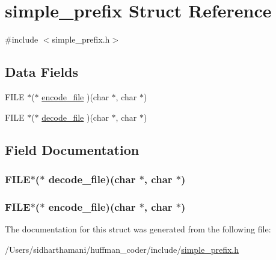 \hypertarget{structsimple__prefix}{\section{simple\-\_\-prefix Struct Reference}
\label{structsimple__prefix}
}


{\ttfamily \#include $<$simple\-\_\-prefix.\-h$>$}

\subsection*{Data Fields}
\begin{DoxyCompactItemize}
\item 
F\-I\-L\-E $\ast$($\ast$ \hyperlink{structsimple__prefix_a73d0a239981b130553964b3839c20bdf}{encode\-\_\-file} )(char $\ast$, char $\ast$)
\item 
F\-I\-L\-E $\ast$($\ast$ \hyperlink{structsimple__prefix_a58708e15f01f3be37e12d3194e953b41}{decode\-\_\-file} )(char $\ast$, char $\ast$)
\end{DoxyCompactItemize}


\subsection{Field Documentation}
\hypertarget{structsimple__prefix_a58708e15f01f3be37e12d3194e953b41}{
\subsubsection[{decode\-\_\-file}]{\setlength{\rightskip}{0pt plus 5cm}F\-I\-L\-E$\ast$($\ast$ decode\-\_\-file)(char $\ast$, char $\ast$)}}\label{structsimple__prefix_a58708e15f01f3be37e12d3194e953b41}
\hypertarget{structsimple__prefix_a73d0a239981b130553964b3839c20bdf}{
\subsubsection[{encode\-\_\-file}]{\setlength{\rightskip}{0pt plus 5cm}F\-I\-L\-E$\ast$($\ast$ encode\-\_\-file)(char $\ast$, char $\ast$)}}\label{structsimple__prefix_a73d0a239981b130553964b3839c20bdf}


The documentation for this struct was generated from the following file\-:\begin{DoxyCompactItemize}
\item 
/\-Users/sidharthamani/huffman\-\_\-coder/include/\hyperlink{simple__prefix_8h}{simple\-\_\-prefix.\-h}\end{DoxyCompactItemize}
